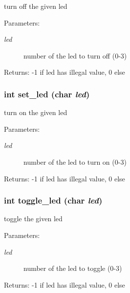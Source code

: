 turn off the given led \begin{Desc}
\item[Parameters:]
\begin{description}
\item[{\em led}]number of the led to turn off (0-3) \end{description}
\end{Desc}
\begin{Desc}
\item[Returns:]-1 if led has illegal value, 0 else \end{Desc}
\subsubsection{\setlength{\rightskip}{0pt plus 5cm}int set\_\-led (char {\em led})}\label{group__LED_gf43daf62ed84fb33cddaf60747a82632}


turn on the given led \begin{Desc}
\item[Parameters:]
\begin{description}
\item[{\em led}]number of the led to turn on (0-3) \end{description}
\end{Desc}
\begin{Desc}
\item[Returns:]-1 if led has illegal value, 0 else \end{Desc}
\subsubsection{\setlength{\rightskip}{0pt plus 5cm}int toggle\_\-led (char {\em led})}\label{group__LED_gefd2b64e1afc42f4660a408da854c6d4}


toggle the given led \begin{Desc}
\item[Parameters:]
\begin{description}
\item[{\em led}]number of the led to toggle (0-3) \end{description}
\end{Desc}
\begin{Desc}
\item[Returns:]-1 if led has illegal value, 0 else \end{Desc}
